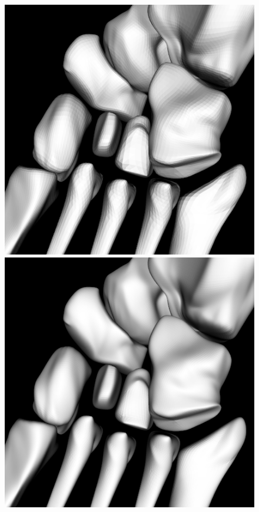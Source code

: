 \documentclass[10pt, conference, compsocconf]{IEEEtran}
\begin{document}
\begin{figure}[htbp]
{\begin{minipage}[h]{0.16\linewidth}
        \includegraphics[width=\textwidth]{./Figure/footbones/middle/loop2.png}\\
        \includegraphics[width=\textwidth]{./Figure/footbones/middle/loop3.png}\vspace{1ex}\\

\end{minipage}}
\end{figure}
\end{document}

